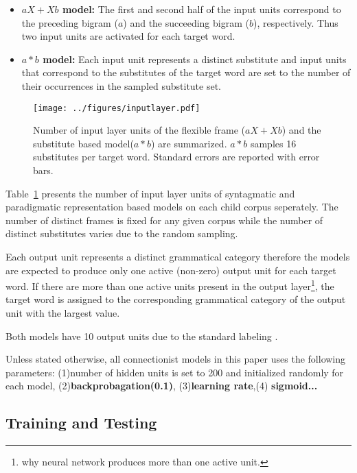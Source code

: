 \begin{itemize}
\item {\bf$aX+Xb$ model:} The first and second half of the input units
  correspond to the preceding bigram ($a$) and the succeeding bigram
  ($b$), respectively.  Thus two input units are activated for each
  target word.
\item {\bf $a*b$ model:} Each input unit represents a distinct
  substitute and input units that correspond to the substitutes of the
  target word are set to the number of their occurrences in the
  sampled substitute set.
\end{itemize}

\begin{figure}[ht]
  \centering
  \texttt{[image: ../figures/inputlayer.pdf]}
  \caption{Number of input layer units of the flexible frame ($aX + Xb$) and
    the substitute based model($a*b$) are summarized.  $a*b$ samples 16
    substitutes per target word.  Standard errors are reported with error bars. 
  }
  \label{fig:inputunits}
\end{figure}
Table~\ref{fig:inputunits} presents the number of input layer units of
syntagmatic and paradigmatic representation based models on each child
corpus seperately.  The number of distinct frames is fixed for any
given corpus while the number of distinct substitutes varies due to
the random sampling.

Each output unit represents a distinct grammatical category therefore the
models are expected to produce only one active (non-zero) output unit for each
target word.  If there are more than one active units present in the output
layer\footnote{why neural network produces more than one active unit.}, the
target word is assigned to the corresponding grammatical category of the output
unit with the largest value.

Both models have 10 output units due to the standard labeling
\citep*{Mintz200391}.

Unless stated otherwise, all connectionist models in this paper uses the
following parameters: (1)number of hidden units is set to 200 and initialized
randomly for each model, (2){\bf backprobagation(0.1)}, (3){\bf learning
rate},(4) {\bf sigmoid...}

\subsection{Training and Testing}
\label{sec:training}

